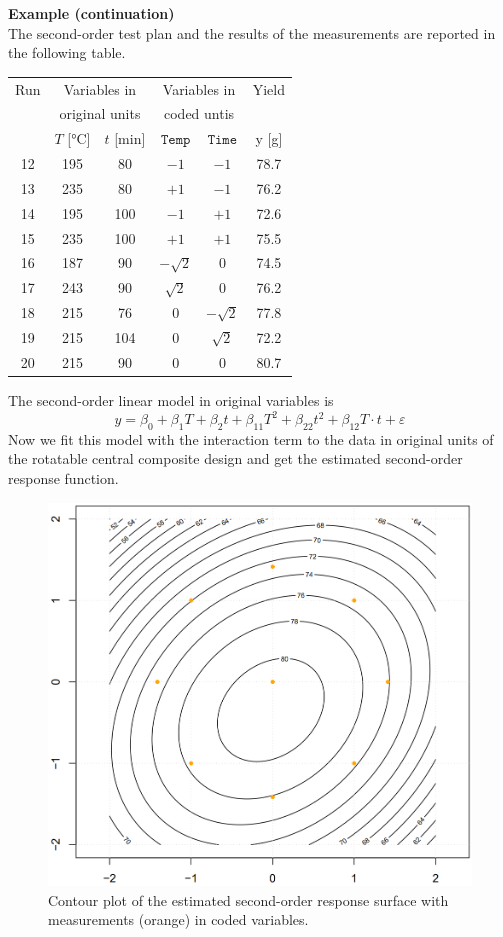 \textbf{Example (continuation)}\\
The second-order test plan and the results of the measurements are reported in the following table.
\begin{table}[H]
  \centering
  \scriptsize
    \begin{tabular}{c|cc|cc|c}
      Run & \multicolumn{2}{c}{Variables in}   & \multicolumn{2}{c}{Variables in} & Yield \\
          & \multicolumn{2}{c}{original units} & \multicolumn{2}{c}{coded untis}  &       \\
          & $T$ [°C] & $t$ [min]               & $\texttt{Temp}$ & $\texttt{Time}$ & y [g]\\ \hline
      12 & 195 & 80  & $-1$        & $-1$        & 78.7 \\
      13 & 235 & 80  & $+1$        & $-1$        & 76.2 \\
      14 & 195 & 100 & $-1$        & $+1$        & 72.6 \\
      15 & 235 & 100 & $+1$        & $+1$        & 75.5 \\
      16 & 187 & 90  & $-\sqrt{2}$ & 0           & 74.5 \\
      17 & 243 & 90  & $ \sqrt{2}$ & 0           & 76.2 \\
      18 & 215 & 76  & 0           & $-\sqrt{2}$ & 77.8 \\
      19 & 215 & 104 & 0           & $ \sqrt{2}$ & 72.2 \\
      20 & 215 & 90  & 0           & 0           & 80.7
    \end{tabular}
\end{table}
The second-order linear model in original variables is
\begin{equation}
  y = \beta_0 + \beta_1 T + \beta_2 t + \beta_{11} T^2 + \beta_{22}t^2 + \beta_{12}T\cdot t + \varepsilon
\end{equation}
Now we fit this model with the interaction term to the data in original units of the rotatable central composite design and get the estimated second-order response function.

\begin{figure}[H]
  \centering
  \includegraphics[width=.7\linewidth]{Pics/15.2.1.png}
  \caption{Contour plot of the estimated second-order response surface with measurements (orange) in coded variables.}
\end{figure}

